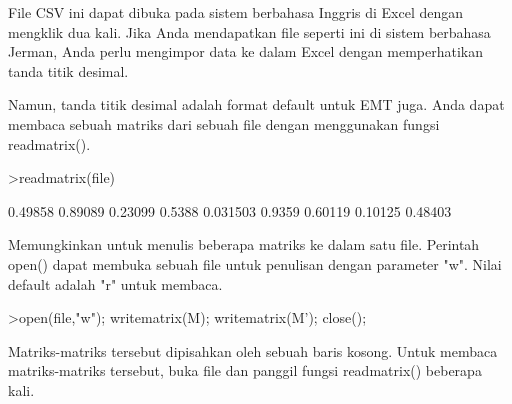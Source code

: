 \documentclass[12pt,arial,letterpaper]{book}
\begin{document}
\begin{eulercomment}
\begin{eulercomment}
\begin{eulercomment}
\begin{eulercomment}
\begin{eulercomment}
\begin{eulercomment}
\begin{eulercomment}
\begin{eulercomment}
\begin{eulercomment}
\begin{eulercomment}
\begin{eulercomment}
\begin{eulercomment}
\begin{eulercomment}
\begin{eulercomment}
\begin{eulercomment}
\begin{eulercomment}
\begin{eulercomment}
\begin{eulercomment}
\begin{eulercomment}
\begin{eulercomment}
\begin{eulercomment}
\begin{eulercomment}
\begin{eulercomment}
\begin{eulercomment}
\begin{eulercomment}
\begin{eulercomment}
\begin{eulercomment}
\begin{eulercomment}
\begin{eulercomment}
\begin{eulercomment}
\begin{eulercomment}
\begin{eulercomment}
\begin{eulercomment}
\begin{eulercomment}
\begin{eulercomment}
\begin{eulercomment}
\begin{eulercomment}
\begin{eulercomment}
\begin{euleroutput}
\end{euleroutput}
\begin{eulercomment}
File CSV ini dapat dibuka pada sistem berbahasa Inggris di Excel
dengan mengklik dua kali. Jika Anda mendapatkan file seperti ini di
sistem berbahasa Jerman, Anda perlu mengimpor data ke dalam Excel
dengan memperhatikan tanda titik desimal.

Namun, tanda titik desimal adalah format default untuk EMT juga. Anda
dapat membaca sebuah matriks dari sebuah file dengan menggunakan
fungsi readmatrix().
\end{eulercomment}
\begin{eulerprompt}
>readmatrix(file)
\end{eulerprompt}
\begin{euleroutput}
    0.49858   0.89089   0.23099 
     0.5388  0.031503    0.9359 
    0.60119   0.10125   0.48403 
\end{euleroutput}
\begin{eulercomment}
Memungkinkan untuk menulis beberapa matriks ke dalam satu file.
Perintah open() dapat membuka sebuah file untuk penulisan dengan
parameter "w". Nilai default adalah "r" untuk membaca.
\end{eulercomment}
\begin{eulerprompt}
>open(file,"w"); writematrix(M); writematrix(M'); close();
\end{eulerprompt}
\begin{eulercomment}
Matriks-matriks tersebut dipisahkan oleh sebuah baris kosong. Untuk
membaca matriks-matriks tersebut, buka file dan panggil fungsi
readmatrix() beberapa kali.
\end{eulercomment}
\begin{eulerprompt}

\end{eulerprompt}
\end{eulercomment}
\end{eulercomment}
\end{eulercomment}
\end{eulercomment}
\end{eulercomment}
\end{eulercomment}
\end{eulercomment}
\end{eulercomment}
\end{eulercomment}
\end{eulercomment}
\end{eulercomment}
\end{eulercomment}
\end{eulercomment}
\end{eulercomment}
\end{eulercomment}
\end{eulercomment}
\end{eulercomment}
\end{eulercomment}
\end{eulercomment}
\end{eulercomment}
\end{eulercomment}
\end{eulercomment}
\end{eulercomment}
\end{eulercomment}
\end{eulercomment}
\end{eulercomment}
\end{eulercomment}
\end{eulercomment}
\end{eulercomment}
\end{eulercomment}
\end{eulercomment}
\end{eulercomment}
\end{eulercomment}
\end{eulercomment}
\end{eulercomment}
\end{eulercomment}
\end{eulercomment}
\end{eulercomment}
\end{document}
